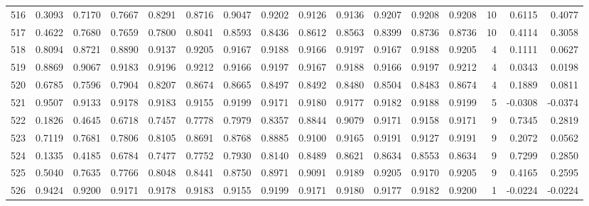 \begin{tabular}{lrrrrrrrrrrrrrrr}
516 &      0.3093 &  0.7170 &  0.7667 &  0.8291 &  0.8716 &  0.9047 &  0.9202 &  0.9126 &  0.9136 &  0.9207 &   0.9208 &     0.9208 &     10 &                    0.6115 &                     0.4077 \\
517 &      0.4622 &  0.7680 &  0.7659 &  0.7800 &  0.8041 &  0.8593 &  0.8436 &  0.8612 &  0.8563 &  0.8399 &   0.8736 &     0.8736 &     10 &                    0.4114 &                     0.3058 \\
518 &      0.8094 &  0.8721 &  0.8890 &  0.9137 &  0.9205 &  0.9167 &  0.9188 &  0.9166 &  0.9197 &  0.9167 &   0.9188 &     0.9205 &      4 &                    0.1111 &                     0.0627 \\
519 &      0.8869 &  0.9067 &  0.9183 &  0.9196 &  0.9212 &  0.9166 &  0.9197 &  0.9167 &  0.9188 &  0.9166 &   0.9197 &     0.9212 &      4 &                    0.0343 &                     0.0198 \\
520 &      0.6785 &  0.7596 &  0.7904 &  0.8207 &  0.8674 &  0.8665 &  0.8497 &  0.8492 &  0.8480 &  0.8504 &   0.8483 &     0.8674 &      4 &                    0.1889 &                     0.0811 \\
521 &      0.9507 &  0.9133 &  0.9178 &  0.9183 &  0.9155 &  0.9199 &  0.9171 &  0.9180 &  0.9177 &  0.9182 &   0.9188 &     0.9199 &      5 &                   -0.0308 &                    -0.0374 \\
522 &      0.1826 &  0.4645 &  0.6718 &  0.7457 &  0.7778 &  0.7979 &  0.8357 &  0.8844 &  0.9079 &  0.9171 &   0.9158 &     0.9171 &      9 &                    0.7345 &                     0.2819 \\
523 &      0.7119 &  0.7681 &  0.7806 &  0.8105 &  0.8691 &  0.8768 &  0.8885 &  0.9100 &  0.9165 &  0.9191 &   0.9127 &     0.9191 &      9 &                    0.2072 &                     0.0562 \\
524 &      0.1335 &  0.4185 &  0.6784 &  0.7477 &  0.7752 &  0.7930 &  0.8140 &  0.8489 &  0.8621 &  0.8634 &   0.8553 &     0.8634 &      9 &                    0.7299 &                     0.2850 \\
525 &      0.5040 &  0.7635 &  0.7766 &  0.8048 &  0.8441 &  0.8750 &  0.8971 &  0.9091 &  0.9189 &  0.9205 &   0.9170 &     0.9205 &      9 &                    0.4165 &                     0.2595 \\
526 &      0.9424 &  0.9200 &  0.9171 &  0.9178 &  0.9183 &  0.9155 &  0.9199 &  0.9171 &  0.9180 &  0.9177 &   0.9182 &     0.9200 &      1 &                   -0.0224 &                    -0.0224 \\

\end{tabular}
